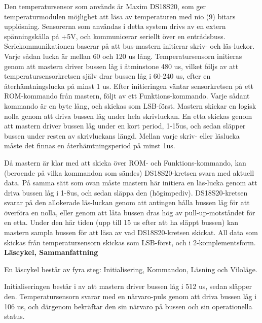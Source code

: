 \documentclass[a4paper,11pt]{article}
\begin{document}
Den temperatursensor som används är Maxim DS18S20, som ger temperaturmodulen möjlighet att läsa av temperaturen
med nio (9) bitars upplösning. Sensorerna som användas i detta system drivs av en extern spänningskälla på +5V,
och kommunicerar seriellt över en entrådsbuss. Seriekommunikationen baserar på att bus-mastern initierar skriv-
och läs-luckor. Varje sådan lucka är mellan 60 och 120 us lång. Temperatursensorn initieras genom att mastern
driver bussen låg i åtminstone 480 us, vilket följs av att temperatursensorkretsen själv drar bussen låg i 60-240 us,
efter en återhämtningslucka på minst 1 us. Efter initieringen väntar sensorkretsen på ett ROM-kommando från mastern,
följt av ett Funktions-kommando. Varje sådant kommando är en byte lång, och skickas som LSB-först. Mastern skickar
en logisk nolla genom att driva bussen låg under hela skrivluckan. En etta skickas genom att mastern driver bussen låg
under en kort period, 1-15us, och sedan släpper bussen under resten av skrivluckans längd. Mellan varje skriv- eller läslucka
måste det finnas en återhämtningsperiod på minst 1us.

Då mastern är klar med att skicka över ROM- och Funktions-kommando, kan (beroende på vilka kommandon som sändes) DS18S20-kretsen
svara med aktuell data. På samma sätt som ovan måste mastern här initiera en läs-lucka genom att driva bussen låg i 1-8us, och
sedan släppa den (högimpediv). DS18S20-kretsen svarar på den allokerade läs-luckan genom att antingen hålla bussen låg för att
överföra en nolla, eller genom att låta bussen dras hög av pull-up-motståndet för en etta. Under den här tiden (upp till 15 us
efter att ha släppt bussen) kan mastern sampla bussen för att läsa av vad DS18S20-kretsen skickat. All data som skickas från
temperatursensorn skickas som LSB-först, och i 2-komplementsform.\\

{\noindent \bf Läscykel, Sammanfattning}

En läscykel består av fyra steg: Initialisering, Kommandon, Läsning och Viloläge.

Initialiseringen består i av att mastern driver bussen låg i 512 us, sedan släpper den.
Temperatursensorn svarar med en närvaro-puls genom att driva bussen låg i 106 us, och därgenom bekräftar den sin närvaro
på bussen och sin operationella status.
\end{document}
